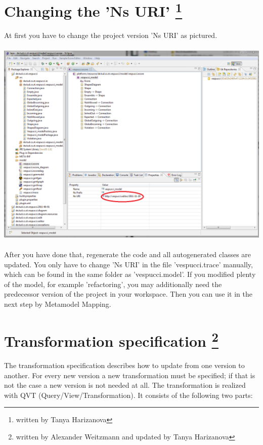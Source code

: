 \documentclass[12pt,a4paper,oneside]{report}
\begin{document}
\section*{Changing the 'Ns URI' \footnote{written by Tanya Harizanova}}
At first you have to change the project version 'Ns URI' as pictured.\\ \\
\includegraphics[width=15cm]{NsURI.png}
\\ \\After you have done that, regenerate the code and all autogenerated classes are
updated. You only have to change 'Ns URI' in the file 'vespucci.trace' manually,
which can be found in the same folder as 'vespucci.model'. If you modified plenty of the model, for example 'refactoring', you may additionally need the predecessor
version of the project in your workspace. Then you can use it in the next step by
Metamodel Mapping.

\section*{Transformation specification \footnote{written by Alexander Weitzmann and updated by Tanya Harizanova}}
The transformation specification describes how to update from one version to another. For every new version a new transformation must be specified; if that is not the case a new version is not needed at all. The transformation is realized with QVT (Query/View/Transformation). It consists of the following two parts:
\end{document}
